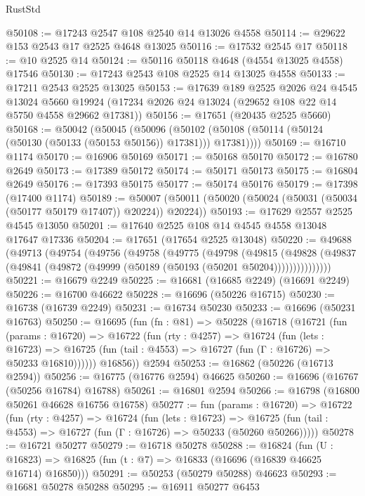 \begin{lexlean}{RustStd}
\begin{coremodule}
@50108 := @17243 @2547 @108 @2540 @14 @13026 @4558
@50114 := @29622 @153 @2543 @17 @2525 @4648 @13025
@50116 := @17532 @2545 @17
@50118 := @10 @2525 @14
@50124 := @50116 @50118 @4648 (@4554 @13025 @4558) @17546
@50130 := @17243 @2543 @108 @2525 @14 @13025 @4558
@50133 := @17211 @2543 @2525 @13025
@50153 := @17639
    @189
    @2525
    @2026
    @24
    @4545
    @13024
    @5660
    @19924
    (@17234 @2026 @24 @13024 (@29652 @108 @22 @14 @5750 @4558 @29662 @17381))
@50156 := @17651 (@20435 @2525 @5660)
@50168 := @50042
    (@50045
      (@50096 (@50102 (@50108 (@50114 (@50124 (@50130 (@50133 (@50153 @50156)) @17381))) @17381))))
@50169 := @16710 @1174
@50170 := @16906 @50169
@50171 := @50168 @50170
@50172 := @16780 @2649
@50173 := @17389 @50172
@50174 := @50171 @50173
@50175 := @16804 @2649
@50176 := @17393 @50175
@50177 := @50174 @50176
@50179 := @17398 (@17400 @1174)
@50189 := @50007 (@50011 (@50020 (@50024 (@50031 (@50034 (@50177 @50179 @17407)) @20224)) @20224))
@50193 := @17629 @2557 @2525 @4545 @13050
@50201 := @17640 @2525 @108 @14 @4545 @4558 @13048 @17647 @17336
@50204 := @17651 (@17654 @2525 @13048)
@50220 := @49688
    (@49713
      (@49754
        (@49756
          (@49758
            (@49775
              (@49798
                (@49815
                  (@49828
                    (@49837 (@49841 (@49872 (@49999 (@50189 (@50193 (@50201 @50204)))))))))))))))
@50221 := @16679 @2249
@50225 := @16681 (@16685 @2249) (@16691 @2249)
@50226 := @16700 @46622
@50228 := @16696 (@50226 @16715)
@50230 := @16738 (@16739 @2249)
@50231 := @16734 @50230
@50233 := @16696 (@50231 @16763)
@50250 := @16695
    (fun (fn : @81) =>
    @50228
      (@16718
        (@16721
          (fun (params : @16720) =>
          @16722
            (fun (rty : @4257) =>
            @16724
              (fun (lets : @16723) =>
              @16725 (fun (tail : @4553) => @16727 (fun (Γ : @16726) => @50233 @16810))))))
        @16856))
    @2594
@50253 := @16862 (@50226 (@16713 @2594))
@50256 := @16775 (@16776 @2594) @46625
@50260 := @16696 (@16767 (@50256 @16784) @16788)
@50261 := @16801 @2594
@50266 := @16798 (@16800 @50261 @46628 @16756 @16758)
@50277 := fun (params : @16720) =>
  @16722
    (fun (rty : @4257) =>
    @16724
      (fun (lets : @16723) =>
      @16725 (fun (tail : @4553) => @16727 (fun (Γ : @16726) => @50233 (@50260 @50266)))))
@50278 := @16721 @50277
@50279 := @16718 @50278
@50288 := @16824
    (fun (U : @16823) => @16825 (fun (t : @7) => @16833 (@16696 (@16839 @46625 @16714) @16850)))
@50291 := @50253 (@50279 @50288) @46623
@50293 := @16681 @50278 @50288
@50295 := @16911 @50277 @6453

\end{coremodule}
\end{lexlean}
